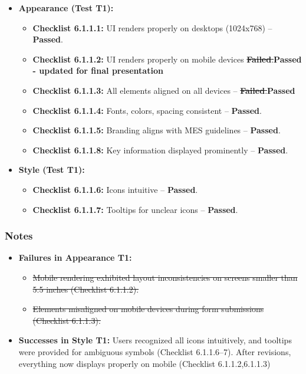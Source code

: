\documentclass[12pt, titlepage]{article}
\begin{document}
\begin{itemize}
    \item \textbf{Appearance (Test T1):}  
    \begin{itemize}
        \item \textbf{Checklist 6.1.1.1:} UI renders properly on desktops (1024x768) – \textbf{Passed}.  
        \item \textbf{Checklist 6.1.1.2:} UI renders properly on mobile devices \st{\textbf{Failed}.}\textbf{Passed - updated for final presentation}
        \item \textbf{Checklist 6.1.1.3:} All elements aligned on all devices – \st{\textbf{Failed}.}\textbf{Passed}
        \item \textbf{Checklist 6.1.1.4:} Fonts, colors, spacing consistent – \textbf{Passed}.  
        \item \textbf{Checklist 6.1.1.5:} Branding aligns with MES guidelines – \textbf{Passed}.  
        \item \textbf{Checklist 6.1.1.8:} Key information displayed prominently – \textbf{Passed}.  
    \end{itemize}
    
    \item \textbf{Style (Test T1):}  
    \begin{itemize}
        \item \textbf{Checklist 6.1.1.6:} Icons intuitive – \textbf{Passed}.  
        \item \textbf{Checklist 6.1.1.7:} Tooltips for unclear icons – \textbf{Passed}.  
    \end{itemize}
\end{itemize}

\subsubsection*{Notes}  
\begin{itemize}
    \item \textbf{Failures in Appearance T1:}  
    \begin{itemize}
        \item \st{Mobile rendering exhibited layout inconsistencies on screens smaller than 5.5 inches (Checklist 6.1.1.2).}  
        \item \st{Elements misaligned on mobile devices during form submissions (Checklist 6.1.1.3).} 
    \end{itemize}
    \item \textbf{Successes in Style T1:} Users recognized all icons intuitively, and tooltips were provided for ambiguous symbols (Checklist 6.1.1.6–7). After revisions, everything now displays properly on mobile (Checklist 6.1.1.2,6.1.1.3)
\end{itemize}
\end{document}
